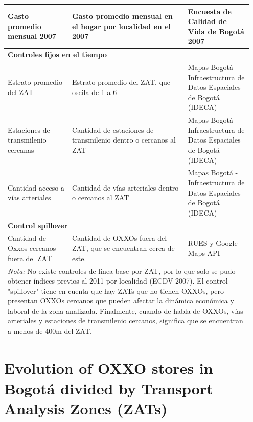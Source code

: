 \documentclass[12pt]{article}
\begin{document}
\begin{longtable}{p{0.25\linewidth} p{0.45\linewidth} p{0.25\linewidth}}
        \midrule
        Gasto promedio mensual 2007 & Gasto promedio mensual en el hogar por localidad en el 2007 & Encuesta de Calidad de Vida de Bogotá 2007 \\
        \midrule
        \multicolumn{3}{l}{\textbf{Controles fijos en el tiempo}} \\
        \midrule
        Estrato promedio del ZAT & Estrato promedio del ZAT, que oscila de 1 a 6 & Mapas Bogotá - Infraestructura de Datos Espaciales de Bogotá (IDECA) \\
        \midrule
        Estaciones de transmilenio cercanas & Cantidad de estaciones de transmilenio dentro o cercanos al ZAT & Mapas Bogotá - Infraestructura de Datos Espaciales de Bogotá (IDECA) \\
        \midrule
        Cantidad acceso a vías arteriales & Cantidad de vías arteriales dentro o cercanos al ZAT & Mapas Bogotá - Infraestructura de Datos Espaciales de Bogotá (IDECA) \\
        \midrule
        \multicolumn{3}{l}{\textbf{Control spillover}} \\
        \midrule
        Cantidad de Oxxos cercanos fuera del ZAT & Cantidad de OXXOs fuera del ZAT, que se encuentran cerca de este. & RUES y Google Maps API \\
        \bottomrule
        \multicolumn{3}{p{\linewidth}}{%
        \vspace{0.5em}
        \footnotesize{ \textit{Nota:} No existe controles de línea base por ZAT, por lo que solo se pudo obtener índices previos al 2011 por localidad (ECDV 2007). El control "spillover" tiene en cuenta que hay ZATs que no tienen OXXOs, pero presentan OXXOs cercanos que pueden afectar la dinámica económica y laboral de la zona analizada. Finalmente, cuando de habla de OXXOs, vías arteriales y estaciones de transmilenio cercanos, significa que se encuentran a menos de 400m del ZAT.}}
\end{longtable}

\section{Evolution of OXXO stores in Bogotá divided by Transport Analysis Zones (ZATs)}
\end{document}
